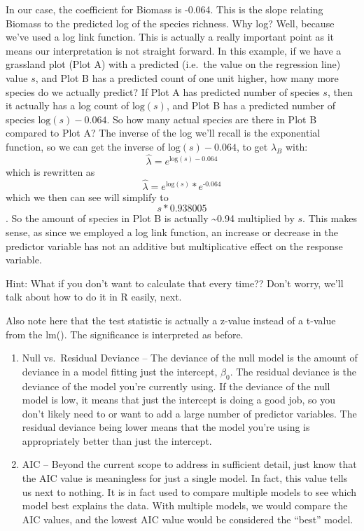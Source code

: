 \documentclass[
]{article}
\begin{document}
In our case, the coefficient for Biomass is -0.064. This is the slope
relating Biomass to the predicted log of the species richness. Why log?
Well, because we've used a log link function. This is actually a really
important point as it means our interpretation is not straight forward.
In this example, if we have a grassland plot (Plot A) with a predicted
(i.e.~the value on the regression line) value \(s\), and Plot B has a
predicted count of one unit higher, how many more species do we actually
predict? If Plot A has predicted number of species \(s\), then it
actually has a log count of \(\text{log}(s)\), and Plot B has a
predicted number of species \(\text{log}(s) - 0.064\). So how many
actual species are there in Plot B compared to Plot A? The inverse of
the log we'll recall is the exponential function, so we can get the
inverse of \(\text{log}(s) - 0.064\), to get \(\hat{\lambda}_B\) with:
\[\hat{\lambda} = e^{\text{log}(s) - 0.064}\] which is rewritten as
\[\hat{\lambda} = e^{\text{log}(s)} * e^\text{-0.064}\] which we then
can see will simplify to \[s * 0.938005\]. So the amount of species in
Plot B is actually \textasciitilde0.94 multiplied by \(s\). This makes
sense, as since we employed a log link function, an increase or decrease
in the predictor variable has not an additive but multiplicative effect
on the response variable.

Hint: What if you don't want to calculate that every time?? Don't worry,
we'll talk about how to do it in R easily, next.

Also note here that the test statistic is actually a z-value instead of
a t-value from the lm(). The significance is interpreted as before.

\begin{enumerate}
\def\labelenumi{\arabic{enumi}.}
\setcounter{enumi}{3}
\item
  Null vs.~Residual Deviance -- The deviance of the null model is the
  amount of deviance in a model fitting just the intercept, \(\beta_0\).
  The residual deviance is the deviance of the model you're currently
  using. If the deviance of the null model is low, it means that just
  the intercept is doing a good job, so you don't likely need to or want
  to add a large number of predictor variables. The residual deviance
  being lower means that the model you're using is appropriately better
  than just the intercept.
\item
  AIC -- Beyond the current scope to address in sufficient detail, just
  know that the AIC value is meaningless for just a single model. In
  fact, this value tells us next to nothing. It is in fact used to
  compare multiple models to see which model best explains the data.
  With multiple models, we would compare the AIC values, and the lowest
  AIC value would be considered the ``best'' model.
\end{enumerate}
\end{document}

